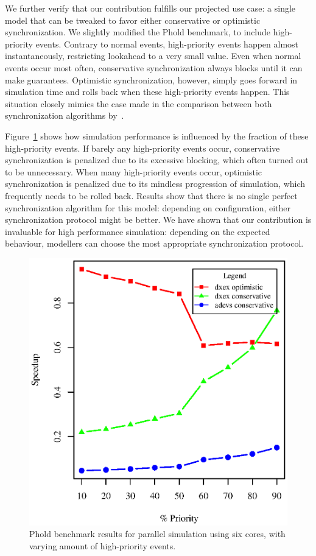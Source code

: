 We further verify that our contribution fulfills our projected use case: a single model that can be tweaked to favor either conservative or optimistic synchronization.
We slightly modified the Phold benchmark, to include high-priority events.
Contrary to normal events, high-priority events happen almost instantaneously, restricting lookahead to a very small value.
Even when normal events occur most often, conservative synchronization always blocks until it can make guarantees.
Optimistic synchronization, however, simply goes forward in simulation time and rolls back when these high-priority events happen.
This situation closely mimics the case made in the comparison between both synchronization algorithms by~\cite{FujimotoBook}.

Figure~\ref{fig:phold_priority} shows how simulation performance is influenced by the fraction of these high-priority events.
If barely any high-priority events occur, conservative synchronization is penalized due to its excessive blocking, which often turned out to be unnecessary.
When many high-priority events occur, optimistic synchronization is penalized due to its mindless progression of simulation, which frequently needs to be rolled back.
Results show that there is no single perfect synchronization algorithm for this model: depending on configuration, either synchronization protocol might be better.
We have shown that our contribution is invaluable for high performance simulation: depending on the expected behaviour, modellers can choose the most appropriate synchronization protocol.

\begin{figure}
    \center
    \includegraphics[width=\plotfraction\columnwidth]{fig/phold_speedup_priority.eps}
    \caption{Phold benchmark results for parallel simulation using six cores, with varying amount of high-priority events.}
    \label{fig:phold_priority}
\end{figure}

